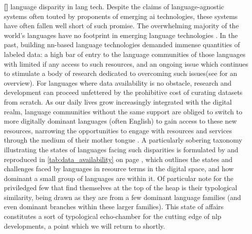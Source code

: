 \documentclass[thesis]{cluu}
\newcounter{paranum}
\newcommand{\numberedparagraph}{\par\refstepcounter{paranum}\textbf{[\theparanum] }}
\begin{document}
\numberedparagraph language disparity in lang tech. 
Despite the claims of language-agnostic systems often touted by proponents of emerging \gls{ai} technologies, these systems have often fallen well short of such promise. The overwhelming majority of the world's languages have no footprint in emerging language technologies \parencite{joshiStateFateLinguistic2021}. In the past, building \gls{nn}-based language technologies demanded immense quantities of labeled data: a high bar of entry to the language communities of those languages with limited if any access to such resources, and an ongoing issue which continues to stimulate a body of research dedicated to overcoming such issues(see \textcite{magueresseLowresourceLanguagesReview2020} for an overview). For languages where data availability is no obstacle, research and development can proceed unfettered by the prohibitive cost of curating datasets from scratch. As our daily lives grow increasingly integrated with the digital realm, language communities without the same support are obliged to switch to more digitally dominant languages (often English) to gain access to these new resources, narrowing the opportunities to engage with resources and services through the medium of their mother tongue \parencite{nichasaideCanWeDefuse2019}. A particularly sobering taxonomy illustrating the states of languages facing such disparities is formulated by \textcite{joshiStateFateLinguistic2021} and reproduced in \cref{tab:data_availability} on page \pageref{tab:data_availability}, which outlines the states and challenges faced by languages in resource terms in the digital space, and how dominant a small group of languages are within it. Of particular note for the priviledged few that find themselves at the top of the heap is their typological similarity, being drawn as they are from a few dominant language families (and even dominant branches within these larger families). This state of affairs constitutes a sort of typological echo-chamber for the cutting edge of \gls{nlp} developments, a point which we will return to shortly.
\end{document}
